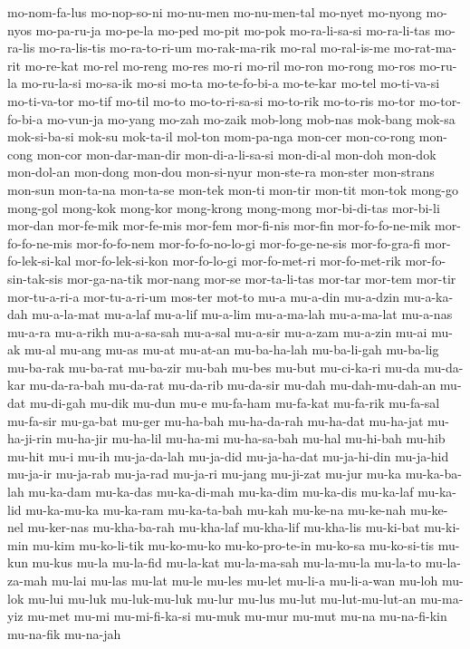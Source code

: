 {mo-nom-fa-lus mo-nop-so-ni mo-nu-men mo-nu-men-tal mo-nyet mo-nyong
mo-nyos mo-pa-ru-ja mo-pe-la mo-ped mo-pit mo-pok mo-ra-li-sa-si
mo-ra-li-tas mo-ra-lis mo-ra-lis-tis mo-ra-to-ri-um mo-rak-ma-rik mo-ral
mo-ral-is-me mo-rat-ma-rit mo-re-kat mo-rel mo-reng mo-res mo-ri mo-ril
mo-ron mo-rong mo-ros mo-ru-la mo-ru-la-si mo-sa-ik mo-si mo-ta
mo-te-fo-bi-a mo-te-kar mo-tel mo-ti-va-si mo-ti-va-tor mo-tif mo-til
mo-to mo-to-ri-sa-si mo-to-rik mo-to-ris mo-tor mo-tor-fo-bi-a mo-vun-ja
mo-yang mo-zah mo-zaik mob-long mob-nas mok-bang mok-sa mok-si-ba-si
mok-su mok-ta-il mol-ton mom-pa-nga mon-cer mon-co-rong mon-cong mon-cor
mon-dar-man-dir mon-di-a-li-sa-si mon-di-al mon-doh mon-dok mon-dol-an
mon-dong mon-dou mon-si-nyur mon-ste-ra mon-ster mon-strans mon-sun
mon-ta-na mon-ta-se mon-tek mon-ti mon-tir mon-tit mon-tok mong-go
mong-gol mong-kok mong-kor mong-krong mong-mong mor-bi-di-tas mor-bi-li
mor-dan mor-fe-mik mor-fe-mis mor-fem mor-fi-nis mor-fin mor-fo-fo-ne-mik
mor-fo-fo-ne-mis mor-fo-fo-nem mor-fo-fo-no-lo-gi mor-fo-ge-ne-sis
mor-fo-gra-fi mor-fo-lek-si-kal mor-fo-lek-si-kon mor-fo-lo-gi
mor-fo-met-ri mor-fo-met-rik mor-fo-sin-tak-sis mor-ga-na-tik mor-nang
mor-se mor-ta-li-tas mor-tar mor-tem mor-tir mor-tu-a-ri-a mor-tu-a-ri-um
mos-ter mot-to mu-a mu-a-din mu-a-dzin mu-a-ka-dah mu-a-la-mat mu-a-laf
mu-a-lif mu-a-lim mu-a-ma-lah mu-a-ma-lat mu-a-nas mu-a-ra mu-a-rikh
mu-a-sa-sah mu-a-sal mu-a-sir mu-a-zam mu-a-zin mu-ai mu-ak mu-al mu-ang
mu-as mu-at mu-at-an mu-ba-ha-lah mu-ba-li-gah mu-ba-lig mu-ba-rak
mu-ba-rat mu-ba-zir mu-bah mu-bes mu-but mu-ci-ka-ri mu-da mu-da-kar
mu-da-ra-bah mu-da-rat mu-da-rib mu-da-sir mu-dah mu-dah-mu-dah-an mu-dat
mu-di-gah mu-dik mu-dun mu-e mu-fa-ham mu-fa-kat mu-fa-rik mu-fa-sal
mu-fa-sir mu-ga-bat mu-ger mu-ha-bah mu-ha-da-rah mu-ha-dat mu-ha-jat
mu-ha-ji-rin mu-ha-jir mu-ha-lil mu-ha-mi mu-ha-sa-bah mu-hal mu-hi-bah
mu-hib mu-hit mu-i mu-ih mu-ja-da-lah mu-ja-did mu-ja-ha-dat mu-ja-hi-din
mu-ja-hid mu-ja-ir mu-ja-rab mu-ja-rad mu-ja-ri mu-jang mu-ji-zat mu-jur
mu-ka mu-ka-ba-lah mu-ka-dam mu-ka-das mu-ka-di-mah mu-ka-dim mu-ka-dis
mu-ka-laf mu-ka-lid mu-ka-mu-ka mu-ka-ram mu-ka-ta-bah mu-kah mu-ke-na
mu-ke-nah mu-ke-nel mu-ker-nas mu-kha-ba-rah mu-kha-laf mu-kha-lif
mu-kha-lis mu-ki-bat mu-ki-min mu-kim mu-ko-li-tik mu-ko-mu-ko
mu-ko-pro-te-in mu-ko-sa mu-ko-si-tis mu-kun mu-kus mu-la mu-la-fid
mu-la-kat mu-la-ma-sah mu-la-mu-la mu-la-to mu-la-za-mah mu-lai mu-las
mu-lat mu-le mu-les mu-let mu-li-a mu-li-a-wan mu-loh mu-lok mu-lui mu-luk
mu-luk-mu-luk mu-lur mu-lus mu-lut mu-lut-mu-lut-an mu-ma-yiz mu-met mu-mi
mu-mi-fi-ka-si mu-muk mu-mur mu-mut mu-na mu-na-fi-kin mu-na-fik mu-na-jah
}
